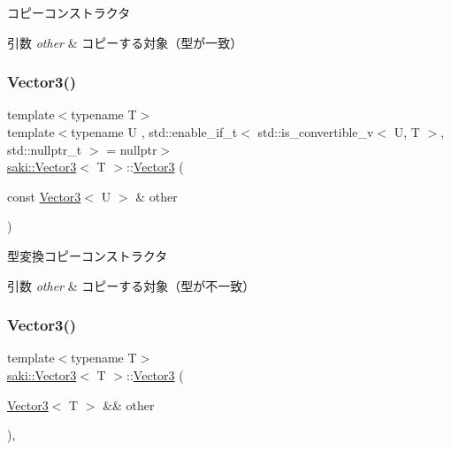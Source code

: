 コピーコンストラクタ 


\begin{DoxyParams}{引数}
{\em other} & コピーする対象（型が一致） \\
\hline
\end{DoxyParams}
\mbox{\label{classsaki_1_1_vector3_a4f7942875ebcc619f4594c0941645ad4}} 
\subsubsection{\texorpdfstring{Vector3()}{Vector3()}\hspace{0.1cm}{\footnotesize\ttfamily [5/7]}}
{\footnotesize\ttfamily template$<$typename T$>$ \\
template$<$typename U , std\+::enable\+\_\+if\+\_\+t$<$ std\+::is\+\_\+convertible\+\_\+v$<$ U, T $>$, std\+::nullptr\+\_\+t $>$  = nullptr$>$ \\
\mbox{\hyperlink{classsaki_1_1_vector3}{saki\+::\+Vector3}}$<$ T $>$\+::\mbox{\hyperlink{classsaki_1_1_vector3}{Vector3}} (\begin{DoxyParamCaption}\item[{const \mbox{\hyperlink{classsaki_1_1_vector3}{Vector3}}$<$ U $>$ \&}]{other }\end{DoxyParamCaption})\hspace{0.3cm}{\ttfamily [inline]}}



型変換コピーコンストラクタ 


\begin{DoxyParams}{引数}
{\em other} & コピーする対象（型が不一致） \\
\hline
\end{DoxyParams}
\mbox{\label{classsaki_1_1_vector3_a89d4f00d2a4b3b4f686079b67709c05c}} 
\subsubsection{\texorpdfstring{Vector3()}{Vector3()}\hspace{0.1cm}{\footnotesize\ttfamily [6/7]}}
{\footnotesize\ttfamily template$<$typename T$>$ \\
\mbox{\hyperlink{classsaki_1_1_vector3}{saki\+::\+Vector3}}$<$ T $>$\+::\mbox{\hyperlink{classsaki_1_1_vector3}{Vector3}} (\begin{DoxyParamCaption}\item[{\mbox{\hyperlink{classsaki_1_1_vector3}{Vector3}}$<$ T $>$ \&\&}]{other }\end{DoxyParamCaption})\hspace{0.3cm}{\ttfamily [inline]}, {\ttfamily [noexcept]}}



